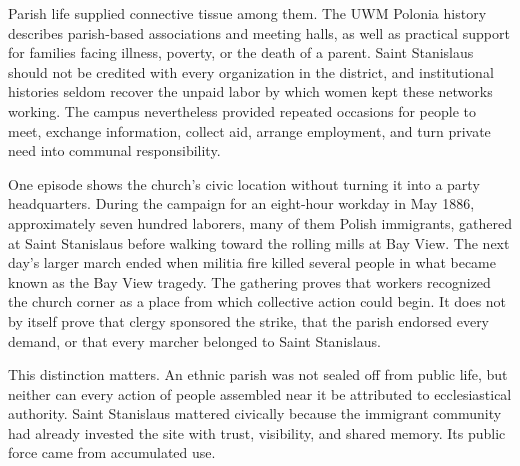 Parish life supplied connective tissue among them. The UWM Polonia history describes parish-based associations and meeting halls, as well as practical support for families facing illness, poverty, or the death of a parent. Saint Stanislaus should not be credited with every organization in the district, and institutional histories seldom recover the unpaid labor by which women kept these networks working. The campus nevertheless provided repeated occasions for people to meet, exchange information, collect aid, arrange employment, and turn private need into communal responsibility.

One episode shows the church's civic location without turning it into a party headquarters. During the campaign for an eight-hour workday in May 1886, approximately seven hundred laborers, many of them Polish immigrants, gathered at Saint Stanislaus before walking toward the rolling mills at Bay View. The next day's larger march ended when militia fire killed several people in what became known as the Bay View tragedy. The gathering proves that workers recognized the church corner as a place from which collective action could begin. It does not by itself prove that clergy sponsored the strike, that the parish endorsed every demand, or that every marcher belonged to Saint Stanislaus.

This distinction matters. An ethnic parish was not sealed off from public life, but neither can every action of people assembled near it be attributed to ecclesiastical authority. Saint Stanislaus mattered civically because the immigrant community had already invested the site with trust, visibility, and shared memory. Its public force came from accumulated use.

